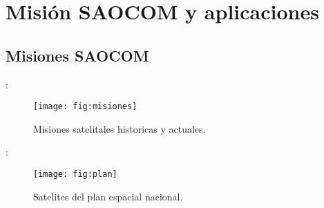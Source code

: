 \section{Misión SAOCOM y aplicaciones}
\subsection{Misiones SAOCOM}
\begin{frame}{\secname : \subsecname}
  \begin{figure}
    \centering
    \texttt{[image: fig:misiones]}
    \caption{Misiones satelitales historicas y actuales.}
    \label{}
  \end{figure}
\end{frame}

\begin{frame}{\secname : \subsecname}
  \begin{figure}
    \centering
    \texttt{[image: fig:plan]}
    \caption{Satelites del plan espacial nacional.}
    \label{}
  \end{figure}
\end{frame}

